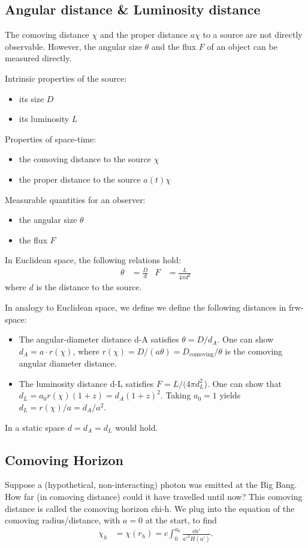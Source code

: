 \subsection{Angular distance \& Luminosity distance}

The comoving distance $\chi$ and the proper distance $a \chi$ to a source are not directly observable. However, the angular size $\theta$ and the flux $F$ of an object can be measured directly.

Intrinsic properties of the source:
\begin{itemize}
	\item its size $D$
	\item its luminosity $L$
\end{itemize}
Properties of space-time:
\begin{itemize}
	\item the comoving distance to the source $\chi$
	\item the proper distance to the source $a(t) \chi$
\end{itemize}
Measurable quantities for an observer:
\begin{itemize}
	\item the angular size $\theta$
	\item the flux $F$
\end{itemize}
In Euclidean space, the following relations hold:
\begin{align*}
	\theta &= \frac{D}{d}
	& F &= \frac{L}{4 \pi d^2}
\end{align*}
where $d$ is the distance to the source.

In analogy to Euclidean space, we define we define the following distances in \ac{frw}-space:
\begin{itemize}
	\item The angular-diameter distance \gls{d-A} satisfies $\theta = D/d_A$. One can show $d_A = a \cdot r(\chi)$, where $r(\chi) = D/(a \theta) = D_\text{comoving}/\theta$ is the comoving angular diameter distance.
	\item The luminosity distance \gls{d-L} satisfies $F = L/(4\pi d_L^2$). One can show that $d_L = a_0 r(\chi) (1+z) = d_A (1+z)^2$. Taking $a_0 = 1$ yields $d_L = r(\chi)/a = d_A/a^2$. 
\end{itemize}
In a static space $d = d_A = d_L$ would hold. 

\subsection{Comoving Horizon}
Suppose a (hypothetical, non-interacting) photon was emitted at the Big Bang. How far (in comoving distance) could it have travelled until now? This comoving distance is called the comoving horizon \gls{chi-h}. We plug into the equation of the comoving radius/distance, with $a=0$ at the start, to find
\begin{align*}
	\chi_h
	&= \chi (r_h) = c \int_0^{a_0} \frac{\dd{a'}}{a'^2 H(a')}.
\end{align*}

